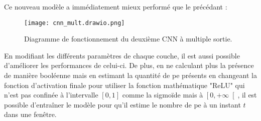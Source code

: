 Ce nouveau modèle a immédiatement mieux performé que le précédant :

\begin{figure}[tbph!]
	\centering
	\texttt{[image: cnn\_mult.drawio.png]}
	\caption[Diagramme de fonctionnement du deuxième CNN à multiple sortie]{Diagramme de fonctionnement du deuxième CNN à multiple sortie.}
\end{figure}

En modifiant les différents paramètres de chaque couche, il est aussi possible d'améliorer les performances de celui-ci.
De plus, en ne calculant plus la présence de manière booléenne mais en estimant la quantité de \gls{pe} présents 
en changeant la fonction d'activation finale pour utiliser la fonction mathématique "ReLU" qui n'est pas confinée 
à l'intervalle $ \left[ 0, 1\right] $ comme la sigmoïde mais à $ \left[0, +\infty\right[ $, il est possible d'entraîner le modèle
pour qu'il estime le nombre de \gls{pe} à un instant $t$ dans une fenêtre. 